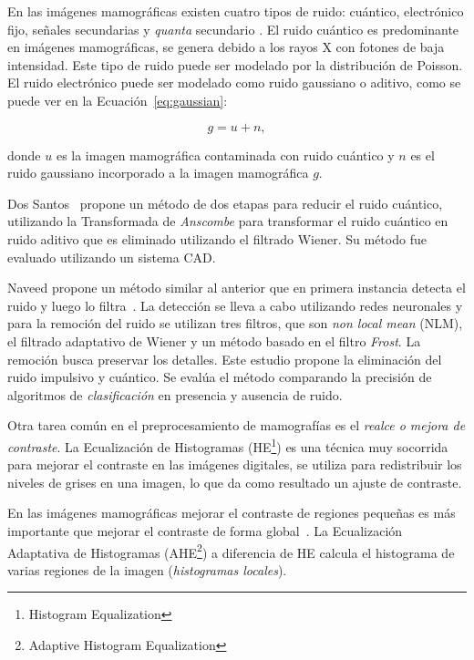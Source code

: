 En las imágenes mamográficas existen cuatro tipos de ruido: cuántico,
electrónico fijo, señales secundarias y \textit{quanta} secundario
\cite{hashimoto2008practical}. El ruido cuántico es predominante en imágenes
mamográficas, se genera debido a los rayos X con fotones de baja intensidad.
Este tipo de ruido puede ser modelado por la distribución de Poisson. El ruido
electrónico puede ser modelado como ruido gaussiano o aditivo, como se puede
ver en la Ecuación~\ref{eq:gaussian}:

\begin{equation}
\label{eq:gaussian}
            g = u + n,
\end{equation}

\noindent donde $u$ es la imagen mamográfica contaminada con ruido cuántico y
$n$ es el ruido gaussiano incorporado a la imagen mamográfica $g$.

Dos Santos~\cite{dos2009mammography} propone un método de dos etapas para
reducir el ruido cuántico, utilizando la Transformada de \textit{Anscombe} para
transformar el ruido cuántico en ruido aditivo que es eliminado utilizando el
filtrado Wiener. Su método fue evaluado utilizando un sistema CAD.

Naveed propone un método similar al anterior que en primera instancia detecta
el ruido y luego lo filtra~\cite{naveed2012quantum}. La detección se lleva a
cabo utilizando redes neuronales y para la remoción del ruido se utilizan tres
filtros, que son \textit{non local mean} (NLM), el filtrado adaptativo de Wiener
y un método basado en el filtro \textit{Frost}. La remoción busca preservar los
detalles. Este estudio propone la eliminación del ruido impulsivo y cuántico.
Se evalúa el método comparando la precisión de algoritmos de
\textit{clasificación} en presencia y ausencia de ruido.

Otra tarea común en el preprocesamiento de mamografías es el \textit{realce o
mejora de contraste}. La Ecualización de Histogramas (HE\footnote{Histogram
Equalization}) es una técnica muy socorrida para mejorar el contraste en las
imágenes digitales, se utiliza para redistribuir los niveles de grises en una
imagen, lo que da como resultado un ajuste de contraste.

En las imágenes mamográficas mejorar el contraste de regiones pequeñas es más
importante que mejorar el contraste de forma global~\cite{mohan2013modified}.
La Ecualización Adaptativa de Histogramas (AHE\footnote{Adaptive Histogram
Equalization}) a diferencia de HE calcula el histograma de varias regiones de
la imagen (\textit{histogramas locales}).

